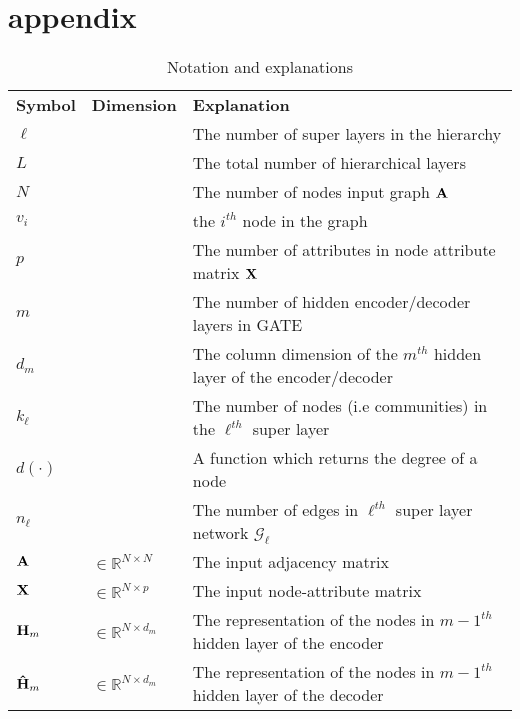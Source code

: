 \documentclass[a4paper,12pt]{article}
\begin{document}
\section*{appendix}
\begin{table}[!ht]
	\centering
	\caption{Notation and explanations}
	\begin{tabular}{p{2cm}|p{3cm}|p{10cm}}
		\toprule[0.08cm]
		\bf Symbol & \centering \bf Dimension & \bf Explanation \\
		\cmidrule(lr){1-3}
		$\ell$ & & The number of super layers in the hierarchy \\
		
		$L$ & & The total number of hierarchical layers  \\
		
		$N$ & & The number of nodes input graph ${\bf A}$ \\
		
		$v_i$ & & the $i^{th}$ node in the graph \\
		
		$p$ & & The number of attributes in node attribute matrix $\bf X$ \\
		
		$m$ & & The number of hidden encoder/decoder layers in GATE \\
		
		$d_m$ & & The column dimension of the $m^{th}$ hidden layer of the encoder/decoder \\
		
		$k_\ell$ & & The number of nodes (i.e communities) in the $\ell^{th}$ super layer \\
		
		$d(\cdot)$ & & A function which returns the degree of a node \\
		
		$n_\ell$ & & The number of edges in $\ell^{th}$ super layer network $\mathcal{G}_{\ell}$ \\
		
		${\bf A}$ & $ \in \mathbb{R}^{N \times N}$ & The input adjacency matrix \\
		
		${\bf X}$ &$\in \mathbb{R}^{N \times p}$ & The input node-attribute matrix \\
		
		${\bf H}_{m}$ & $\in \mathbb{R}^{N \times d_{m}}$ & The representation of the nodes in ${m-1}^{th}$ hidden layer of the encoder\\
		
		${\bf \hat{H}}_{m}$ & $\in \mathbb{R}^{N \times d_{m}}$ & The representation of the nodes in ${m-1}^{th}$ hidden layer of the decoder\\
		

\end{tabular}
\end{table}
\end{document}
